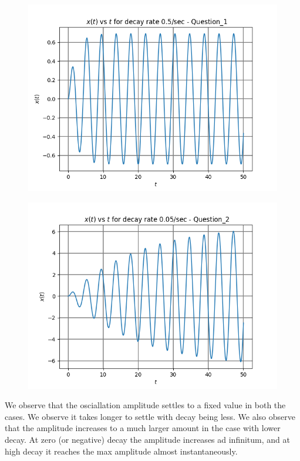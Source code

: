 \documentclass[11pt, a4paper]{article}
\begin{document}
\begin{figure}[!tbh]
   	\centering
   	\includegraphics[scale=0.5]{figure0.png}
   	\label{fig:32}
   \end{figure}
\begin{figure}[!tbh]
   	\centering
   	\includegraphics[scale=0.5]{figure1.png}
   	\label{fig:32}
   \end{figure}
{
We observe that the osciallation amplitude settles to  a fixed value in both the cases.
We observe it takes longer to settle with decay being less.
We also observe that the amplitude increases to a much larger amount in the case with lower decay.
At zero (or negative) decay the amplitude increases ad infinitum, and at high decay it reaches the max amplitude almost instantaneously.
}
\end{document}

